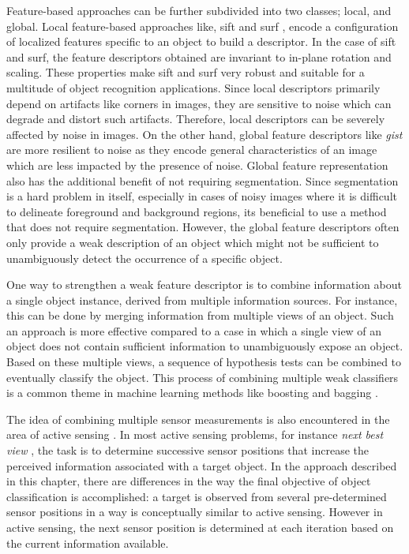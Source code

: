 \documentclass {udthesis}
\begin{document}
Feature-based approaches can be further subdivided into two classes; local, and global. Local feature-based approaches like, \gls{sift} \cite{sift} and \gls{surf} \cite{surf}, encode a configuration of localized features specific to an object to build a descriptor. In the case of \gls{sift} and \gls{surf}, the feature descriptors obtained are invariant to in-plane rotation and scaling. These properties make \gls{sift} and \gls{surf} very robust and suitable for a multitude of object recognition applications. Since local descriptors primarily depend on artifacts like corners in images, they are sensitive to noise which can degrade and distort such artifacts. Therefore, local descriptors can be severely affected by noise in images. On the other hand, global feature descriptors like \textit{gist} \cite{gist} are more resilient to noise as they encode general characteristics of an image which are less impacted by the presence of noise. Global feature representation also has the additional benefit of not requiring segmentation. Since segmentation is a hard problem in itself, especially in
cases of noisy images where it is difficult to delineate foreground and background regions, its beneficial to use a method that does not require segmentation. However, the global feature descriptors often only provide a weak description of an object which might not be sufficient to unambiguously detect the occurrence of a specific object.

One way to strengthen a weak feature descriptor is to combine information about a single object instance, derived from multiple information sources. For instance, this can be done by merging information from multiple views of an object. Such an approach is more effective compared to a case in which a single view of an object does not contain sufficient information to unambiguously expose an object. Based on these multiple views, a sequence of hypothesis tests can be combined to eventually classify the object. This process of combining multiple weak classifiers is a common theme in machine learning methods like boosting and bagging \cite{alpaydin}.

The idea of combining multiple sensor measurements is also encountered in the area of active sensing \cite{chen}. In most active sensing problems, for instance \emph{next best view} \cite{roy,dunn}, the task is to determine successive sensor positions that increase the perceived information  associated with a target object. In the approach described in this chapter, there are differences in the way the final objective of object classification is accomplished: a target is observed from several pre-determined sensor positions in a way is conceptually similar to active sensing. However in active sensing, the next sensor position is determined at each iteration based on the current information available.
\end{document}
